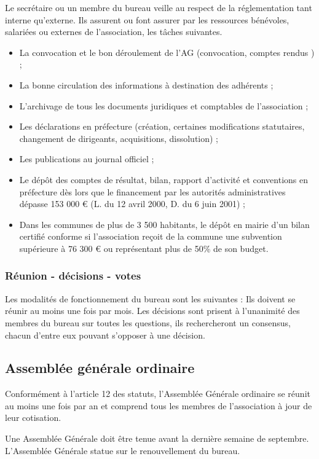 \documentclass[a4paper,french,10pt]{article}
\begin{document}
Le secrétaire ou un membre du bureau veille au respect de la réglementation tant interne
qu’externe. Ils assurent ou font assurer par les ressources bénévoles,
salariées ou externes de l’association, les tâches suivantes.
\begin{itemize}
\item La convocation et le bon déroulement de l’AG (convocation, comptes rendus ) ;
\item La bonne circulation des informations à destination des adhérents ;
\item L’archivage de tous les documents juridiques et comptables de l’association ;
\item Les déclarations en préfecture (création, certaines modifications statutaires, changement de dirigeants, acquisitions, dissolution) ;
\item Les publications au journal officiel ;
\item Le dépôt des comptes de résultat, bilan, rapport d’activité et conventions en préfecture dès lors que le financement par les autorités administratives dépasse 153 000 \euro{} (L. du 12 avril 2000, D. du 6 juin 2001) ;
\item Dans les communes de plus de 3 500 habitants, le dépôt en mairie d’un bilan certifié conforme si l’association reçoit de la commune une subvention supérieure à 76 300 \euro{} ou représentant plus de 50\% de son budget.
\end{itemize}

\subsubsection{Réunion - décisions - votes}
\label{sec:reun-decis-votes}

Les modalités de fonctionnement du bureau sont les suivantes : Ils
doivent se réunir au moins une fois par mois. Les décisions sont
prisent à l'unanimité des membres du bureau sur toutes les questions,
ils rechercheront un consensus, chacun d’entre eux pouvant s’opposer à
une décision.

\subsection{Assemblée générale ordinaire}
Conformément à l'article 12 des statuts, l’Assemblée Générale ordinaire se réunit au moins une fois par an et comprend tous les membres de l’association à jour de leur cotisation.

Une Assemblée Générale doit être tenue avant la dernière semaine de septembre. L'Assemblée Générale statue sur le renouvellement du bureau.
\end{document}
